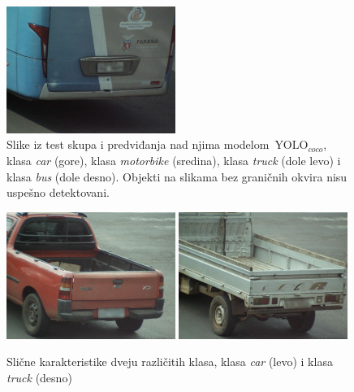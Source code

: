 \documentclass[12pt,oneside]{memoir}
\newcommand{\yolo}{\ensuremath{\,\textrm{YOLO}}}
\begin{document}
\begin{figure}[htbp]
      \includegraphics[width=0.49\textwidth]{matfmaster/yolo/v4/base/bus_0.jpg}
    \caption{Slike iz test skupa i predviđanja nad njima modelom $\yolo_{coco}$, klasa \textit{car} (gore), klasa \textit{motorbike} (sredina),  klasa \textit{truck} (dole levo) i  klasa \textit{bus} (dole desno). Objekti na slikama bez graničnih okvira nisu uspešno detektovani.} \label{fig:YOLO4_COCO_predictions}
\end{figure}

\begin{figure}[htbp]
    \centering
      \includegraphics[width=0.49\textwidth]{matfmaster/glava4/carproblem.jpg}
      \includegraphics[width=0.49\textwidth]{matfmaster/glava4/truckproblem.jpg}
    \caption{Slične karakteristike dveju različitih klasa, klasa \textit{car} (levo) i klasa \textit{truck} (desno) } \label{fig:YOLO4_COCO_car_vs_truck}
\end{figure}


\end{document}
